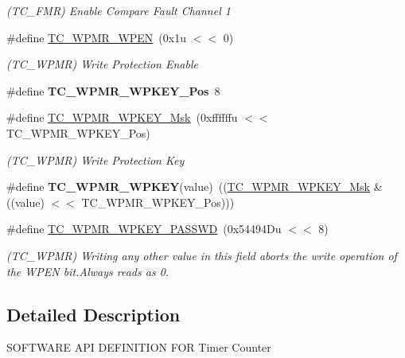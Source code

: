 \begin{DoxyCompactItemize}
\begin{DoxyCompactList}\small\item\em (T\+C\+\_\+\+F\+MR) Enable Compare Fault Channel 1 \end{DoxyCompactList}\item 
\mbox{\label{group__SAME70__TC_ga8d7a567f57170fe4ba4277910eba2696}} 
\#define \mbox{\hyperlink{group__SAME70__TC_ga8d7a567f57170fe4ba4277910eba2696}{T\+C\+\_\+\+W\+P\+M\+R\+\_\+\+W\+P\+EN}}~(0x1u $<$$<$ 0)
\begin{DoxyCompactList}\small\item\em (T\+C\+\_\+\+W\+P\+MR) Write Protection Enable \end{DoxyCompactList}\item 
\mbox{\label{group__SAME70__TC_gaaf064db5e99cb63d2bdef0cf72712e20}} 
\#define {\bfseries T\+C\+\_\+\+W\+P\+M\+R\+\_\+\+W\+P\+K\+E\+Y\+\_\+\+Pos}~8
\item 
\mbox{\label{group__SAME70__TC_gaa4d7b0a1655bf8ad889ea5eee9918c15}} 
\#define \mbox{\hyperlink{group__SAME70__TC_gaa4d7b0a1655bf8ad889ea5eee9918c15}{T\+C\+\_\+\+W\+P\+M\+R\+\_\+\+W\+P\+K\+E\+Y\+\_\+\+Msk}}~(0xffffffu $<$$<$ T\+C\+\_\+\+W\+P\+M\+R\+\_\+\+W\+P\+K\+E\+Y\+\_\+\+Pos)
\begin{DoxyCompactList}\small\item\em (T\+C\+\_\+\+W\+P\+MR) Write Protection Key \end{DoxyCompactList}\item 
\mbox{\label{group__SAME70__TC_gad9651444d0660a932cca46764204160b}} 
\#define {\bfseries T\+C\+\_\+\+W\+P\+M\+R\+\_\+\+W\+P\+K\+EY}(value)~((\mbox{\hyperlink{group__SAMV71__TC_gaa4d7b0a1655bf8ad889ea5eee9918c15}{T\+C\+\_\+\+W\+P\+M\+R\+\_\+\+W\+P\+K\+E\+Y\+\_\+\+Msk}} \& ((value) $<$$<$ T\+C\+\_\+\+W\+P\+M\+R\+\_\+\+W\+P\+K\+E\+Y\+\_\+\+Pos)))
\item 
\mbox{\label{group__SAME70__TC_ga9ea243bbd57d7aaffd1d7c9d41bffd12}} 
\#define \mbox{\hyperlink{group__SAME70__TC_ga9ea243bbd57d7aaffd1d7c9d41bffd12}{T\+C\+\_\+\+W\+P\+M\+R\+\_\+\+W\+P\+K\+E\+Y\+\_\+\+P\+A\+S\+S\+WD}}~(0x54494\+Du $<$$<$ 8)
\begin{DoxyCompactList}\small\item\em (T\+C\+\_\+\+W\+P\+MR) Writing any other value in this field aborts the write operation of the W\+P\+EN bit.\+Always reads as 0. \end{DoxyCompactList}\end{DoxyCompactItemize}


\subsection{Detailed Description}
S\+O\+F\+T\+W\+A\+RE A\+PI D\+E\+F\+I\+N\+I\+T\+I\+ON F\+OR Timer Counter 